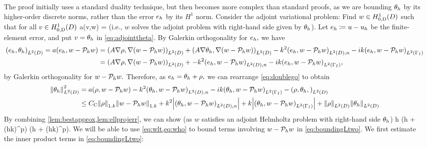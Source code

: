 The proof initially uses a standard duality technique, but then becomes more complex than standard proofs, as we are bounding $\theta_{h}$ by its higher-order discrete norms, rather than the error $e_{h}$ by its $H^1$ norm.
Consider the adjoint variational problem: Find $w \in \HozDD$ such that for all $v \in \HozDD$
\beq\label{eq:adjointtheta}
a(v,w) = 
\eeq
(i.e., $w$ solves the adjoint problem with right-hand side given by $\theta_{h}$). Let $e_{h} \coloneqq u -u_{h}$ be the finite-element error, and put $v = \theta_{h}$ in \cref{eq:adjointtheta}. By Galerkin orthogonality for $e_{h},$ we have
\begin{align}
\IPLtD{\eh}{\thetah} = a(\eh,w-\Ph w) &= \IPLtD{A \grad \rho}{\grad(w-\Ph w)} + \IPLtD{A \grad \thetah}{\grad(w-\Ph w)} -k^2 \IPLtDn{\eh}{w-\Ph w} -ik \IPLtGI{\eh}{w-\Ph w}\nonumber\\
&= \IPLtD{A \grad \rho}{\grad(w-\Ph w)} + -k^2 \IPLtDn{\eh}{w-\Ph w} -ik \IPLtGI{\eh}{w-\Ph w},\label{eq:doublego}
\end{align}
by Galerkin orthogonality for $w - \mathcal P_{h} w.$ Therefore, as $e_{h} = \theta_{h} + \rho,$ we can rearrange \cref{eq:doublego} to obtain
\begin{align}
\NLtD{\thetah}^2 &= a(\rho,w - \Ph w) -k^2 \IPLtDn{\thetah}{w-\Ph w} -ik \IPLtGI{\thetah}{w - \Ph w} - \IPLtD{\rho,\thetah}\nonumber\\
&\leq \Cc \NW{\rho} \NW{w- \Ph w} + k^2 \abs{\IPLtDn{\thetah}{w- \Ph w}} + k \abs{\IPLtGI{\thetah}{w-\Ph w}} + \NLtD{\rho}\NLtD{\thetah}\label{eq:boundingLtwo}
\end{align}
By combining \cref{lem:bestapprox,lem:ellprojerr}, we can show (as $w$ satisfies an adjoint Helmholtz problem with right-hand side $\theta_{h}$)
\beq\label{eq:wlt}
 \leq {} h \mleft(\CFEMotilde h + \CFEMttilde \CAnk (hk)^p\mright)\NLtD{\thetah} \tand
\eeq
\beq\label{eq:who}
 \leq {} \mleft(\CFEMotilde h + \CFEMttilde \CAnk (hk)^p\mright)\NLtD{\thetah}.
\eeq
We will be able to use \cref{eq:wlt,eq:who} to bound terms involving $w - \mathcal P_{h} w$ in \cref{eq:boundingLtwo}. We first estimate the inner product terms in \cref{eq:boundingLtwo}:
